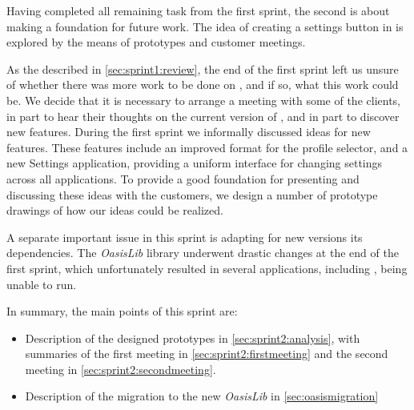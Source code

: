 Having completed all remaining task from the first sprint, the second is about making a foundation for future work.
The idea of creating a settings button in \launcher is explored by the means of prototypes and customer meetings.

As the described in \cref{sec:sprint1:review}, the end of the first sprint left us unsure of whether there was more work to be done on \launcher, and if so, what this work could be. 
We decide that it is necessary to arrange a meeting with some of the clients, in part to hear their thoughts on the current version of \launcher, and in part to discover new features.
During the first sprint we informally discussed ideas for new features.
These features include an improved format for the profile selector, and a new Settings application, providing a uniform interface for changing settings across all applications. 
To provide a good foundation for presenting and discussing these ideas with the customers, we design a number of prototype drawings of how our ideas could be realized.

A separate important issue in this sprint is adapting \launcher for new versions its dependencies. 
The \textit{OasisLib} library underwent drastic changes at the end of the first sprint, which unfortunately resulted in several applications, including \launcher, being unable to run.

In summary, the main points of this sprint are:

\begin{itemize}
\item Description of the designed prototypes in \cref{sec:sprint2:analysis}, with summaries of the first meeting in \cref{sec:sprint2:firstmeeting} and the second meeting in \cref{sec:sprint2:secondmeeting}.
\item Description of the migration to the new \textit{OasisLib} in \cref{sec:oasismigration}
\end{itemize}